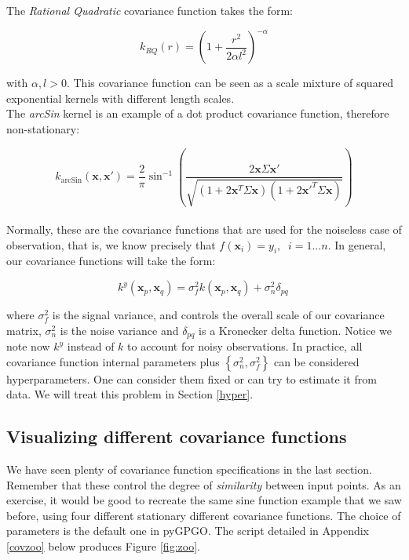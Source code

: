 \documentclass[10pt,a4paper,twoside]{book}
\begin{document}
The \textit{Rational Quadratic} covariance function takes the form:

\begin{equation}
k_{RQ}(r) = \left( 1 + \dfrac{r^2}{2\alpha l^2} \right)^{-\alpha}
\end{equation}

with $\alpha, l > 0$. This covariance function can be seen as a scale mixture of squared exponential kernels with different length scales.\\


The \textit{arcSin} kernel is an example of a dot product covariance function, therefore non-stationary:

\begin{equation}
k_{\textrm{arcSin}}(\boldsymbol{x}, \boldsymbol{x'}) = \dfrac{2}{\pi}\sin^{-1}\left(\dfrac{2\boldsymbol{x}\Sigma\boldsymbol{x'}}{\sqrt{(1 + 2\boldsymbol{x}^T\Sigma\boldsymbol{x})(1 + 2\boldsymbol{x'}^T\Sigma\boldsymbol{x})}}   \right)
\end{equation}\\

Normally, these are the covariance functions that are used for the noiseless case of observation, that is, we know precisely that $f(\boldsymbol{x}_i) = y_i, \;\; i=1\dots n$. In general, our covariance functions will take the form:

\begin{equation}
k^y(\boldsymbol{x}_p, \boldsymbol{x}_q) = \sigma^2_f k(\boldsymbol{x}_p, \boldsymbol{x}_q) + \sigma^2_n \delta_{pq} \,
\end{equation}

where $\sigma^2_f$ is the signal variance, and controls the overall scale of our covariance matrix, $\sigma^2_n$ is the noise variance and $\delta_{pq}$ is a Kronecker delta function. Notice we note now $k^y$ instead of $k$ to account for noisy observations. In practice, all covariance function internal parameters plus $\left\lbrace\sigma_n^2, \sigma^2_f\right\rbrace$ can be considered hyperparameters. One can consider them fixed or can try to estimate it from data. We will treat this problem in Section \ref{hyper}.


\subsection{Visualizing different covariance functions}

We have seen plenty of covariance function specifications in the last section. Remember that these control the degree of \textit{similarity} between input points. As an exercise, it would be good to recreate the same sine function example that we saw before, using four different stationary different covariance functions. The choice of parameters is the default one in pyGPGO. The script detailed in Appendix \ref{covzoo} below produces Figure \ref{fig:zoo}. \\
\end{document}
